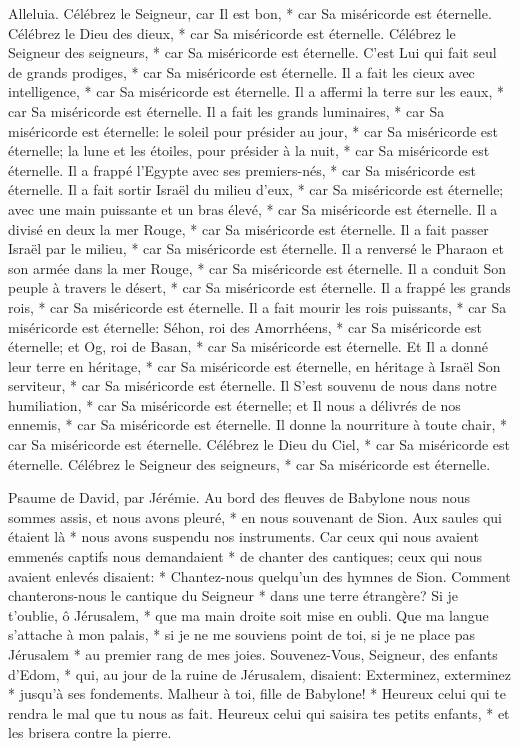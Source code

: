 Alleluia. Célébrez le Seigneur, car Il est bon, * car Sa miséricorde est éternelle.
Célébrez le Dieu des dieux, * car Sa miséricorde est éternelle.
Célébrez le Seigneur des seigneurs, * car Sa miséricorde est éternelle.
C'est Lui qui fait seul de grands prodiges, * car Sa miséricorde est éternelle.
Il a fait les cieux avec intelligence, * car Sa miséricorde est éternelle.
Il a affermi la terre sur les eaux, * car Sa miséricorde est éternelle.
Il a fait les grands luminaires, * car Sa miséricorde est éternelle:
le soleil pour présider au jour, * car Sa miséricorde est éternelle;
la lune et les étoiles, pour présider à la nuit, * car Sa miséricorde est éternelle.
Il a frappé l'Egypte avec ses premiers-nés, * car Sa miséricorde est éternelle.
Il a fait sortir Israël du milieu d'eux, * car Sa miséricorde est éternelle;
avec une main puissante et un bras élevé, * car Sa miséricorde est éternelle.
Il a divisé en deux la mer Rouge, * car Sa miséricorde est éternelle.
Il a fait passer Israël par le milieu, * car Sa miséricorde est éternelle.
Il a renversé le Pharaon et son armée dans la mer Rouge, * car Sa miséricorde est éternelle.
Il a conduit Son peuple à travers le désert, * car Sa miséricorde est éternelle.
Il a frappé les grands rois, * car Sa miséricorde est éternelle.
Il a fait mourir les rois puissants, * car Sa miséricorde est éternelle:
Séhon, roi des Amorrhéens, * car Sa miséricorde est éternelle;
et Og, roi de Basan, * car Sa miséricorde est éternelle.
Et Il a donné leur terre en héritage, * car Sa miséricorde est éternelle,
en héritage à Israël Son serviteur, * car Sa miséricorde est éternelle.
Il S'est souvenu de nous dans notre humiliation, * car Sa miséricorde est éternelle;
et Il nous a délivrés de nos ennemis, * car Sa miséricorde est éternelle.
Il donne la nourriture à toute chair, * car Sa miséricorde est éternelle.
Célébrez le Dieu du Ciel, * car Sa miséricorde est éternelle. Célébrez le Seigneur des seigneurs, * car Sa miséricorde est éternelle.

Psaume de David, par Jérémie. Au bord des fleuves de Babylone nous nous sommes assis, et nous avons pleuré, * en nous souvenant de Sion.
Aux saules qui étaient là * nous avons suspendu nos instruments.
Car ceux qui nous avaient emmenés captifs nous demandaient * de chanter des cantiques; ceux qui nous avaient enlevés disaient: * Chantez-nous quelqu'un des hymnes de Sion.
Comment chanterons-nous le cantique du Seigneur * dans une terre étrangère?
Si je t'oublie, ô Jérusalem, * que ma main droite soit mise en oubli.
Que ma langue s'attache à mon palais, * si je ne me souviens point de toi, si je ne place pas Jérusalem * au premier rang de mes joies.
Souvenez-Vous, Seigneur, des enfants d'Edom, * qui, au jour de la ruine de Jérusalem, disaient: Exterminez, exterminez * jusqu'à ses fondements.
Malheur à toi, fille de Babylone! * Heureux celui qui te rendra le mal que tu nous as fait.
Heureux celui qui saisira tes petits enfants, * et les brisera contre la pierre.

